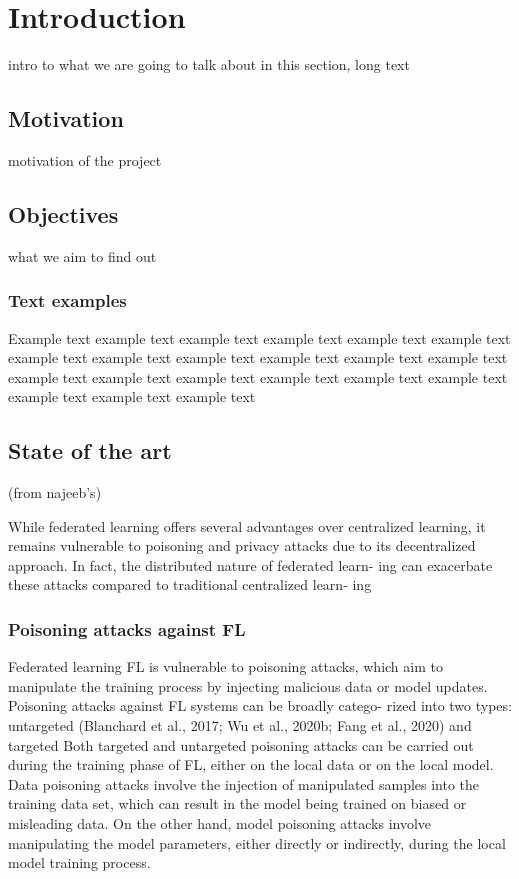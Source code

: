 \section{Introduction}
intro to what we are going to talk about in this section, long text
\subsection{Motivation}
motivation of the project
\subsection{Objectives}
what we aim to find out

\subsubsection{Text examples}
Example text example text example text example text example text example text example text
example text example text example text example text example text example text example text
example text example text example text example text example text example text example text

\subsection{State of the art}
(from najeeb's)

While federated learning offers several advantages over centralized learning, 
it remains vulnerable to poisoning and privacy attacks due to its decentralized 
approach. In fact, the distributed nature of federated learn- ing can 
exacerbate these attacks compared to traditional centralized learn- ing

\subsubsection{Poisoning attacks against FL}
Federated learning FL is vulnerable to poisoning attacks, which aim to 
manipulate the training process by injecting malicious data or model updates. 
Poisoning attacks against FL systems can be broadly catego- rized into two 
types: untargeted (Blanchard et al., 2017; Wu et al., 2020b; Fang et al., 2020) 
and targeted 
Both targeted and untargeted poisoning attacks can be carried out during the 
training phase of FL, either on the local data or on the local model. Data 
poisoning attacks involve the injection of manipulated samples into the training 
data set, which can result in the model being trained on biased or misleading data. 
On the other hand, model poisoning attacks involve manipulating the model 
parameters, either directly or indirectly, during the local model training 
process.

